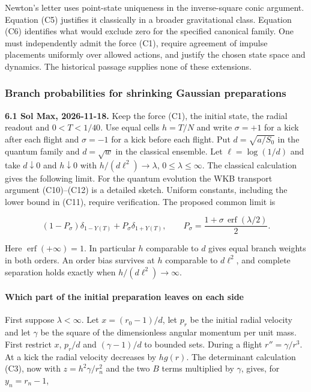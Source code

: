 \documentclass[11pt,a4paper]{article}
\begin{document}
Newton's letter uses point-state uniqueness in the inverse-square conic
argument. Equation (C5) justifies it classically in a broader
gravitational class. Equation (C6) identifies what would exclude zero
for the specified canonical family. One must independently admit the
force (C1), require agreement of impulse placements uniformly over
allowed actions, and justify the chosen state space and dynamics. The
historical passage supplies none of these extensions.

\subsubsection{Branch probabilities for shrinking Gaussian
preparations}\label{branch-probabilities-for-shrinking-gaussian-preparations}

\textbf{6.1 Sol Max, 2026-11-18.} Keep the force (C1), the initial
state, the radial readout and \(0<T<1/40\). Use equal cells \(h=T/N\)
and write \(\sigma=+1\) for a kick after each flight and \(\sigma=-1\)
for a kick before each flight. Put \(d=\sqrt{a/S_0}\) in the quantum
family and \(d=\sqrt w\) in the classical ensemble. Let
\(\ell=\log(1/d)\) and take \(d\downarrow0\) and \(h\downarrow0\) with
\(h/(d\ell^2)\to\lambda\), \(0\le\lambda\le\infty\). The classical
calculation gives the following limit. For the quantum evolution the WKB
transport argument (C10)--(C12) is a detailed sketch. Uniform constants,
including the lower bound in (C11), require verification. The proposed
common limit is

\[
 (1-P_\sigma)\delta_{1-Y(T)}+P_\sigma\delta_{1+Y(T)},\qquad
 P_\sigma=\frac{1+\sigma\,\operatorname{erf}(\lambda/2)}2 .
 \tag{C7}
\]

Here \(\operatorname{erf}(+\infty)=1\). In particular \(h\) comparable
to \(d\) gives equal branch weights in both orders. An order bias
survives at \(h\) comparable to \(d\ell^2\), and complete separation
holds exactly when \(h/(d\ell^2)\to\infty\).

\paragraph{Which part of the initial preparation leaves on each
side}\label{which-part-of-the-initial-preparation-leaves-on-each-side}

First suppose \(\lambda<\infty\). Let \(x=(r_0-1)/d\), let \(p_r\) be
the initial radial velocity and let \(\gamma\) be the square of the
dimensionless angular momentum per unit mass. First restrict \(x\),
\(p_r/d\) and \((\gamma-1)/d\) to bounded sets. During a flight
\(r''=\gamma/r^3\). At a kick the radial velocity decreases by
\(h g(r)\). The determinant calculation (C3), now with
\(z=h^2\gamma/r_n^2\) and the two \(B\) terms multiplied by \(\gamma\),
gives, for \(y_n=r_n-1\),
\end{document}
